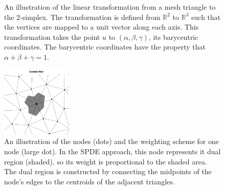 \documentclass{interact}
\begin{document}
\begin{figure}[t!]\centering

\hspace{2em}

\caption{An illustration of the linear transformation from a mesh triangle to
the 2-simplex. The transformation is defined from \(\mathbb{R}^{2}\) to
\(\mathbb{R}^{3}\) such that the vertices are mapped to a unit vector along
each axis. This transformation takes the point \(u\) to
\((\alpha, \beta, \gamma)\), its barycentric coordinates. The barycentric
coordinates have the property that \(\alpha + \beta + \gamma = 1\).}
\label{triangle}
\end{figure}

\begin{figure}[t!]\centering
\includegraphics[width=0.3\textwidth]{figures/dual.pdf}
\caption{An illustration of the nodes (dots) and the weighting scheme for one
node (large dot). In the SPDE approach, this node represents it dual region
(shaded), so its weight is proportional to the shaded area. The dual region is
constructed by connecting the midpoints of the node's edges to the centroids
of the adjacent triangles.}
\label{dual}
\end{figure}
\end{document}
